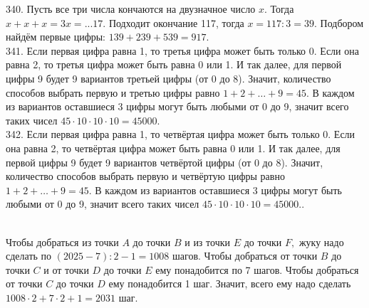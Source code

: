 \documentclass[12pt]{article}
\begin{document}
340. Пусть все три числа кончаются на двузначное число $x.$ Тогда $x+x+x=3x=...17.$ Подходит окончание 117, тогда $x=117:3=39.$ Подбором найдём первые цифры: $139+239+539=917.$\\
341. Если первая цифра равна 1, то третья цифра может быть только 0. Если она равна 2, то третья цифра может быть равна 0 или 1. И так далее, для первой цифры 9 будет 9 вариантов третьей цифры (от 0 до 8). Значит, количество способов выбрать первую и третью цифры равно $1+2+\ldots+9=45.$ В каждом из вариантов оставшиеся 3 цифры могут быть любыми от 0 до 9, значит всего таких чисел $45\cdot10\cdot10\cdot10=45000.$\\
342. Если первая цифра равна 1, то четвёртая цифра может быть только 0. Если она равна 2, то четвёртая цифра может быть равна 0 или 1. И так далее, для первой цифры 9 будет 9 вариантов четвёртой цифры (от 0 до 8). Значит, количество способов выбрать первую и четвёртую цифры равно $1+2+\ldots+9=45.$ В каждом из вариантов оставшиеся 3 цифры могут быть любыми от 0 до 9, значит всего таких чисел $45\cdot10\cdot10\cdot10=45000.$\newpage{}. \begin{figure}[ht!]
\end{figure}\\
Чтобы добраться из точки $A$ до точки $B$ и из точки $E$ до точки $F,$ жуку надо сделать по $(2025-7):2-1=1008$ шагов. Чтобы добраться от точки $B$ до точки $C$ и от точки $D$ до точки $E$ ему понадобится по 7 шагов. Чтобы добраться от точки $C$ до точки $D$ ему понадобится 1 шаг. Значит, всего ему надо сделать $1008\cdot2+7\cdot2+1=2031$ шаг.\\
\end{document}
